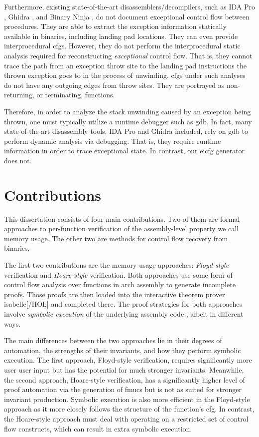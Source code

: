 Furthermore, existing state-of-the-art disassemblers/decompilers, such as IDA Pro \autocite{ida}, Ghidra \autocite{ghidra}, and Binary Ninja \autocite{binary-ninja}, do not document exceptional control flow between procedures.
They are able to extract the exception information statically available in binaries, including landing pad locations.
They can even provide interprocedural \acp{cfg}.
However, they do not perform the interprocedural static analysis required for reconstructing \emph{exceptional} control flow.
That is, they cannot trace the path from an exception throw site to the landing pad instructions the thrown exception goes to in the process of unwinding.
\Acp{cfg} under such analyses do not have any outgoing edges from throw sites.
They are portrayed as non-returning, or terminating, functions.

Therefore, in order to analyze the stack unwinding caused by an exception being thrown, one must typically utilize a runtime debugger such as \ac{gdb}.
In fact, many state-of-the-art disassembly tools, IDA Pro and Ghidra included,
rely on \ac{gdb} to perform dynamic analysis via debugging.
That is, they require runtime information in order to trace exceptional state.
In contrast, our \ac{eicfg} generator does not.

\section{Contributions}
This dissertation consists of four main contributions.
Two of them are formal approaches to per-function verification of the assembly-level property we call memory usage.
The other two are methods for control flow recovery from binaries.

The first two contributions are the memory usage approaches: \emph{Floyd-style} verification and \emph{Hoare-style} verification.
Both approaches use some form of control flow analysis over functions in \gls{arch} assembly to generate incomplete proofs.
Those proofs are then loaded into the interactive theorem prover \gls{isabelle}[/HOL] \autocite{nipkow2002isabelle} and completed there.
The proof strategies for both approaches involve \emph{symbolic execution} of the underlying assembly code \autocite{king1976symbolic}, albeit in different ways.

The main differences between the two approaches lie in their degrees of automation, the strengths of their invariants, and how they perform symbolic execution.
The first approach, Floyd-style verification, requires significantly more user user input but has the potential for much stronger invariants.
Meanwhile, the second approach, Hoare-style verification, has a significantly higher level of proof automation via the generation of \acp{fmuc} but is not as suited for stronger invariant production.
Symbolic execution is also more efficient in the Floyd-style approach as it more closely follows the structure of the function's \ac{cfg}.
In contrast, the Hoare-style approach must deal with operating on a restricted set of control flow constructs, which can result in extra symbolic execution.

